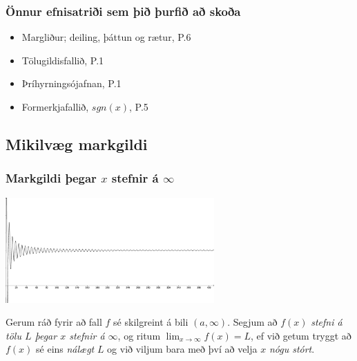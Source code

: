 \documentclass[icelandic,a4paper,12pt]{article}
\begin{document}
\subsubsection*{Önnur efnisatriði sem þið þurfið að skoða}

\begin{itemize}
\item Margliður; deiling, þáttun og rætur, P.6
\item Tölugildisfallið, P.1
\item Þríhyrningsójafnan, P.1
 \item Formerkjafallið, $sgn(x)$, P.5
\end{itemize}

 

\date{5.~september 2012}


	\maketitle


\subsection*{Mikilvæg markgildi}



\subsubsection*{Markgildi þegar $x$ stefnir á $\infty$}
\begin{center}
 \includegraphics[width=8cm,keepaspectratio=true]{./myndir/kafli01/03_liminf.png}
\end{center}
\pause
 Gerum ráð fyrir að fall $f$ sé
skilgreint á bili $(a, \infty)$.  Segjum að  $f(x)$
{\it stefni á tölu $L$ þegar $x$ stefnir á $\infty$}, og ritum
$\lim_{x\rightarrow \infty} f(x)=L$, ef við getum tryggt að  $f(x)$ sé eins
{\em nálægt}
$L$ og við viljum bara með því að velja $x$ {\em nógu stórt}.
 
\end{document}
